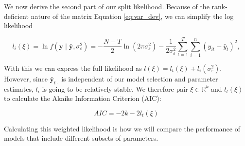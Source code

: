 We now derive the second part of our split likelihood. Because of the rank-deficient nature of the matrix Equation \ref{eq:var_dev}, we can simplify the log likelihood

\begin{equation}
l_i(\xi) = \ln f(\mathbf{y} \mid \bar{\mathbf{y}}, \sigma_\varepsilon^2)
= -\frac{N-T}{2} \ln(2 \pi \sigma_\varepsilon^2)
- \frac{1}{2 \sigma_\varepsilon^2} \sum_{t=1}^{T} \sum_{i=1}^{n} 
\left( y_{it} - \bar{y}_t \right)^2,
\end{equation}


With this we can express the full likelihood as $l(\xi) = l_t(\xi) + l_i(\sigma_\varepsilon^2)$. However, since $\bar{\mathbf{y}}_{t\cdot}$ is independent of our model selection and parameter estimates, $l_i$ is going to be relatively stable. We therefore pair $\xi \in \mathbb{R}^k$ and $l_t(\xi)$ to calculate the Akaike Information Criterion (AIC): 

$$ AIC = -2k -2l_t(\xi) $$

Calculating this weighted likelihood is how we will compare the performance of models that include different subsets of parameters.




